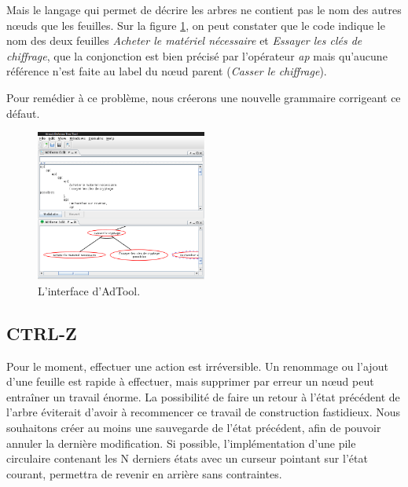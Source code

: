 	Mais le langage qui permet de décrire les arbres ne contient pas le nom des autres nœuds que les feuilles. Sur la figure \ref{fig:int_adTool}, on peut constater que le code indique le nom des deux feuilles \textit{Acheter le matériel nécessaire} et \textit{Essayer les clés de chiffrage}, que la conjonction est bien précisé par l'opérateur \textit{ap} mais qu'aucune référence n'est faite au label du nœud parent (\textit{Casser le chiffrage}).

	Pour remédier à ce problème, nous créerons une nouvelle grammaire corrigeant ce défaut.



	\begin{figure}
		\centering
		\includegraphics[width=0.5\textwidth]{figure/interface_adtool.png}
		\caption{L'interface d'AdTool.}
		\label{fig:int_adTool}
	\end{figure}
	
	\subsection{CTRL-Z}
	Pour le moment, effectuer une action est irréversible. Un renommage ou l'ajout d'une feuille est rapide à effectuer, mais supprimer par erreur un nœud peut entraîner un travail énorme. La possibilité de faire un retour à l'état précédent de l'arbre éviterait d'avoir à recommencer ce travail de construction fastidieux. Nous souhaitons créer au moins une sauvegarde de l'état précédent, afin de pouvoir annuler la dernière modification. Si possible, l'implémentation d'une pile circulaire contenant les N derniers états avec un curseur pointant sur l'état courant, permettra de revenir en arrière sans contraintes.

